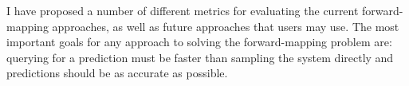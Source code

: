 I have proposed a number of different metrics for evaluating the current forward-mapping approaches, as well as future approaches that users may use.
The most important goals for any approach to solving the forward-mapping problem are: querying for a prediction must be faster than sampling the system directly and predictions should be as accurate as possible.






